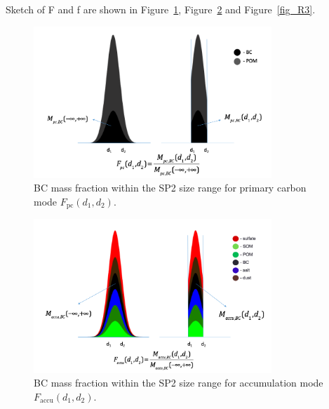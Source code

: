 \documentclass[12pt, fullpage]{uiucthesis2009}
\begin{document}
	Sketch of F and f are shown in Figure~\ref{fig_R1}, Figure~\ref{fig_R2} and Figure~\ref{fig_R3}.
	
	\begin{figure}[h] 
		\begin{center}
			\includegraphics[width = 0.8\textwidth]{Rplot05}
			\caption[BC mass fraction within the SP2 size range for primary carbon mode $F_{\text{pc}}(d_{1}, d_{2})$]{\label{fig_R1} BC mass fraction within the SP2 size range for primary carbon mode $F_{\text{pc}}(d_{1}, d_{2})$.}
		\end{center}
	\end{figure}
	
	\begin{figure}[h] 
		\begin{center}
			\includegraphics[width = 0.8\textwidth]{Rplot06}
			\caption[BC mass fraction within the SP2 size range for accumulation mode $F_{\text{accu}}(d_{1}, d_{2})$]{\label{fig_R2} BC mass fraction within the SP2 size range for accumulation mode $F_{\text{accu}}(d_{1}, d_{2})$.}
		\end{center}
	\end{figure}
	
\end{document}
